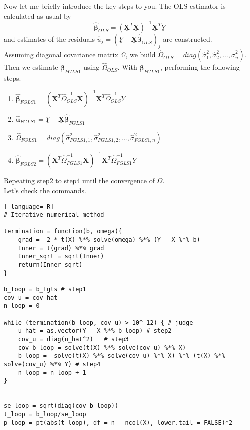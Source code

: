 \documentclass{article}
\theoremstyle{definition}
\begin{document}
Now let me briefly introduce the key steps to you. The OLS estimator is calculated as usual by\\
\begin{equation*}
\hat{\bm{\beta}}_{OLS} = \left(\underline{\bm{X}}^{T} \underline{\bm{X}} \right)^{-1} \underline{\bm{X}}^{T} \underline{Y}
\end{equation*}
and estimates of the residuals $\hat{u}_j = (\underline{Y} - \underline{\bm{X}} \hat{\bm{\beta}}_{OLS})_j$ are constructed.\\

Assuming diagonal covariance matrix $\Omega$, we build $\widehat{\Omega}_{OLS} = diag(\hat{\sigma}^2_1, \hat{\sigma}^2_2, \dots, \hat{\sigma}^2_n ) $.\\

Then we estimate $\bm{\beta}_{FGLS1}$ using $\widehat{\Omega}_{OLS}$. With $\bm{\beta}_{FGLS1}$, performing the following steps.\\

\begin{enumerate}[setp1]
\item 
$ \hat{\bm{\beta}}_{FGLS1} = \left(\underline{\bm{X}}^{T} \widehat{\Omega}^{-1}_{OLS} \underline{\bm{X}} \right)^{-1} \underline{\bm{X}}^{T} \widehat{\Omega}^{-1}_{OLS} \underline{Y} $
\item 
$\hat{\bm{u}}_{FGLS1} = \underline{Y} - \underline{\bm{X}}\hat{\bm{\beta}}_{FGLS1} $ \label{step2}
\item 
$\widehat{\Omega}_{FGLS1} = diag(\hat{\sigma}^2_{FGLS1,1}, \hat{\sigma}^2_{FGLS1,2}, \dots, \hat{\sigma}^2_{FGLS1,n} ) $
\item
$ \hat{\bm{\beta}}_{FGLS2} = \left(\underline{\bm{X}}^{T} \widehat{\Omega}^{-1}_{FGLS1} \underline{\bm{X}} \right)^{-1} \underline{\bm{X}}^{T} \widehat{\Omega}^{-1}_{FGLS1} \underline{Y} $
\end{enumerate}

Repeating step2 to step4 until the convergence of $\widehat{\Omega}$. \\

Let's check the commands.\\

\begin{lstlisting}[ language= R]
# Iterative numerical method

termination = function(b, omega){
	grad = -2 * t(X) %*% solve(omega) %*% (Y - X %*% b)
	Inner = t(grad) %*% grad
	Inner_sqrt = sqrt(Inner)
	return(Inner_sqrt)
}

b_loop = b_fgls # step1
cov_u = cov_hat
n_loop = 0

while (termination(b_loop, cov_u) > 10^-12) { # judge
	u_hat = as.vector(Y - X %*% b_loop) # step2
	cov_u = diag(u_hat^2)   # step3
	cov_b_loop = solve(t(X) %*% solve(cov_u) %*% X)
	b_loop =  solve(t(X) %*% solve(cov_u) %*% X) %*% (t(X) %*% solve(cov_u) %*% Y) # step4
	n_loop = n_loop + 1
}


se_loop = sqrt(diag(cov_b_loop))
t_loop = b_loop/se_loop
p_loop = pt(abs(t_loop), df = n - ncol(X), lower.tail = FALSE)*2
\end{lstlisting}
\end{document}
